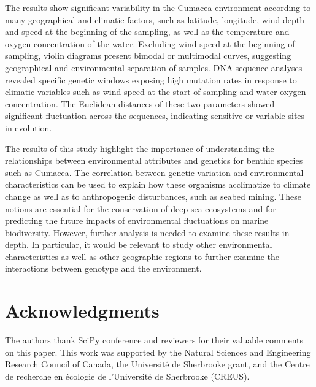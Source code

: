 The results show significant variability in the Cumacea environment according to many geographical and climatic factors, such as latitude, longitude, wind depth and speed at the beginning of the sampling, as well as the temperature and oxygen concentration of the water. Excluding wind speed at the beginning of sampling, violin diagrams present bimodal or multimodal curves, suggesting geographical and environmental separation of samples. DNA sequence analyses revealed specific genetic windows exposing high mutation rates in response to climatic variables such as wind speed at the start of sampling and water oxygen concentration. The Euclidean distances of these two parameters showed significant fluctuation across the sequences, indicating sensitive or variable sites in evolution.

The results of this study highlight the importance of understanding the relationships between environmental attributes and genetics for benthic species such as Cumacea. The correlation between genetic variation and environmental characteristics can be used to explain how these organisms acclimatize to climate change as well as to anthropogenic disturbances, such as seabed mining. These notions are essential for the conservation of deep-sea ecosystems and for predicting the future impacts of environmental fluctuations on marine biodiversity. However, further analysis is needed to examine these results in depth. In particular, it would be relevant to study other environmental characteristics as well as other geographic regions to further examine the interactions between genotype and the environment.


\section{Acknowledgments}\label{acknowledgments}

The authors thank SciPy conference and reviewers for their valuable comments on this paper. This work was supported by the Natural Sciences and Engineering Research Council of Canada, the Université de Sherbrooke grant, and the Centre de recherche en écologie de l’Université de Sherbrooke (CREUS).
